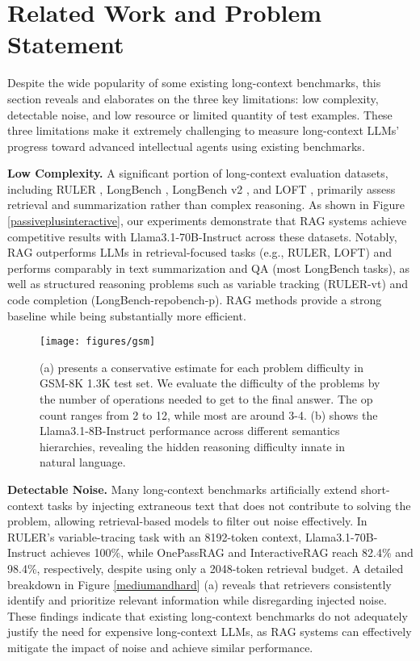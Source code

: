 \section{Related Work and Problem Statement} 
Despite the wide popularity of some existing long-context benchmarks, this section reveals and elaborates on the three key limitations: low complexity, detectable noise, and low resource or limited quantity of test examples. These three limitations make it extremely challenging to measure long-context LLMs' progress toward advanced intellectual agents using existing benchmarks. 

\textbf{Low Complexity.} A significant portion of long-context evaluation datasets, including RULER \citep{hsieh2024rulerwhatsrealcontext}, LongBench \citep{bai2024longbenchbilingualmultitaskbenchmark}, LongBench v2 \citep{bai2025longbenchv2deeperunderstanding}, and LOFT \citep{lee2024longcontextlanguagemodelssubsume}, primarily assess retrieval and summarization rather than complex reasoning. As shown in Figure \ref{passiveplusinteractive}, our experiments demonstrate that RAG systems achieve competitive results with Llama3.1-70B-Instruct across these datasets. Notably, RAG outperforms LLMs in retrieval-focused tasks (e.g., RULER, LOFT) and performs comparably in text summarization and QA (most LongBench tasks), as well as structured reasoning problems such as variable tracking (RULER-vt) and code completion (LongBench-repobench-p). RAG methods provide a strong baseline while being substantially more efficient.

\begin{wrapfigure}{r}{0.5\textwidth} 
    \texttt{[image: figures/gsm]} 
    \caption{(a) presents a conservative estimate for each problem difficulty in GSM-8K 1.3K test set. We evaluate the difficulty of the problems by the number of operations needed to get to the final answer. The op count ranges from 2 to 12, while most are around 3-4. (b) shows the Llama3.1-8B-Instruct performance across different semantics hierarchies, revealing the hidden reasoning difficulty innate in natural language.} 
    \label{gsm8kvariability} 
\end{wrapfigure} 

\textbf{Detectable Noise.} Many long-context benchmarks artificially extend short-context tasks by injecting extraneous text that does not contribute to solving the problem, allowing retrieval-based models to filter out noise effectively. In RULER's variable-tracing task with an 8192-token context, Llama3.1-70B-Instruct achieves 100\%, while OnePassRAG and InteractiveRAG reach 82.4\% and 98.4\%, respectively, despite using only a 2048-token retrieval budget. A detailed breakdown in Figure \ref{mediumandhard} (a) reveals that retrievers consistently identify and prioritize relevant information while disregarding injected noise. These findings indicate that existing long-context benchmarks do not adequately justify the need for expensive long-context LLMs, as RAG systems can effectively mitigate the impact of noise and achieve similar performance. 

